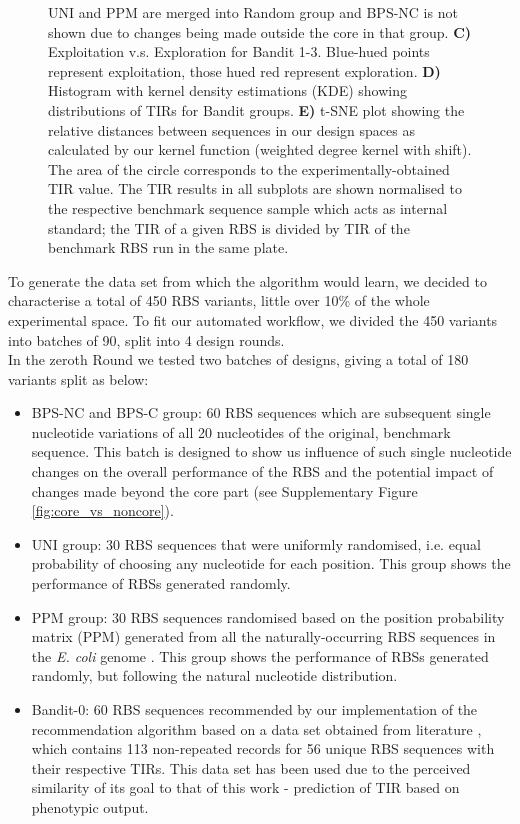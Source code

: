 \documentclass{article}
\newcommand{\mengyan}[1]{\textcolor{magenta}{#1}}
\begin{document}
\begin{figure}[!ht]
{    UNI and PPM are merged into Random group and BPS-NC is not shown due to changes being made outside the core in that group.
    \textbf{C)} Exploitation v.s. Exploration for Bandit 1-3. Blue-hued points represent exploitation, those hued red represent exploration.
    \textbf{D)} Histogram with kernel density estimations (KDE) showing distributions of TIRs for Bandit groups.
    \textbf{E)} t-SNE plot showing the relative distances between sequences in our design spaces as calculated by our kernel function (weighted degree kernel with shift). 
    The area of the circle corresponds to the experimentally-obtained TIR value.
    The TIR results in all subplots are shown normalised to the respective benchmark sequence sample which acts as internal standard; the TIR of a given RBS is divided by TIR of the benchmark RBS run in the same plate. }
    \label{fig: Swarmplot and Quantplot}
\end{figure}

To generate the data set from which the algorithm would learn, we decided to characterise a total of 450 RBS variants, little over 10\% of the whole experimental space. 
To fit our automated workflow, we divided the 450 variants into batches of 90, split into 4 design rounds.\\

In the zeroth Round we tested two batches of designs, giving a total of 180 variants split as below: 

\begin{itemize}
    \item BPS-NC and BPS-C group: 60 RBS sequences which are subsequent single nucleotide variations of all 20 nucleotides of the original, benchmark sequence. This batch is designed to show us influence of such single nucleotide changes on the overall performance of the RBS and the potential impact of changes made beyond the core part (see Supplementary Figure \ref{fig:core_vs_noncore}).
    \item UNI group: 30 RBS sequences that were uniformly randomised, i.e. equal probability of choosing any nucleotide for each position. This group shows the performance of RBSs generated randomly.
    \item PPM group: 30 RBS sequences randomised based on the position probability matrix (PPM) generated from all the naturally-occurring RBS sequences in  the \emph{E. coli} genome \cite{barrick1994quantitative}. This group shows the performance of RBSs generated randomly, but following the natural nucleotide distribution.
    \item Bandit-0: 60 RBS sequences recommended by our implementation of the recommendation algorithm based on a data set obtained from literature \cite{jervis2018machine}, which contains 113 non-repeated records for 56 unique RBS sequences with their respective TIRs.
    This data set has been used due to the perceived similarity of its goal to that of this work - prediction of TIR based on phenotypic output.
\end{itemize}
\end{document}

